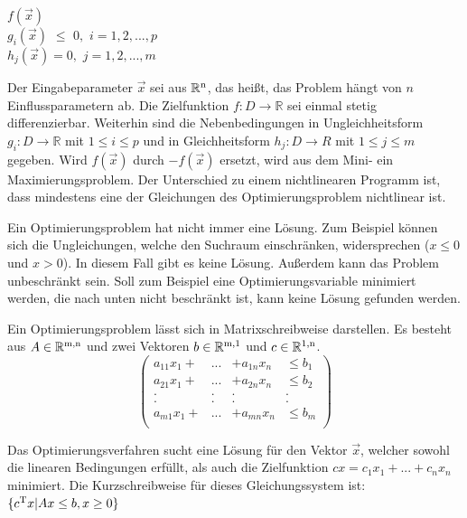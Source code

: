 \documentclass{like}
\begin{document}
\noindent\hspace*{3mm}%
$f(\vec{x}) $ \\
\noindent\hspace*{3mm}%
$g_i(\vec{x})$ $\leq$ $0,$ $i=1,2,...,p$  \\
\noindent\hspace*{50mm}%
$h_j(\vec{x})= 0,$ $j= 1,2,...,m$\\ 
\noindent\hspace*{50mm}%


Der Eingabeparameter $\vec{x}$ sei aus $\mathbb{R} \textsuperscript{n} $, das heißt, das Problem hängt von \(n\) Einflussparametern ab. Die Zielfunktion $f:D \rightarrow \mathbb{R} $ sei einmal stetig differenzierbar. Weiterhin sind die Nebenbedingungen in Ungleichheitsform $g_i:D \rightarrow \mathbb{R}$ mit $1\leq i \leq p$ und in Gleichheitsform $h_j:D \rightarrow \!R$ mit $1\leq j \leq m$ gegeben.
Wird \(f(\vec{x})\) durch \(-f(\vec{x})\) ersetzt, wird aus dem Mini- ein Maximierungsproblem. Der Unterschied zu einem nichtlinearen Programm ist, dass mindestens eine der Gleichungen des Optimierungsproblem nichtlinear ist.

Ein Optimierungsproblem hat nicht immer eine Lösung. Zum Beispiel können sich die  Ungleichungen, welche den Suchraum einschränken, widersprechen ($x \leq 0 $ und $x > 0$). In diesem Fall gibt es keine Lösung. Außerdem kann das Problem unbeschränkt sein. Soll zum Beispiel eine Optimierungsvariable minimiert werden, die nach unten nicht beschränkt ist, kann keine Lösung gefunden werden. 

Ein Optimierungsproblem lässt sich in Matrixschreibweise darstellen. Es besteht aus $A \in \mathbb{R} \textsuperscript{m,n}$ und zwei Vektoren $b \in \mathbb{R} \textsuperscript{m,1}$ und $c \in \mathbb{R} \textsuperscript{1,n}$. \\

\[ \left( \begin{array}{cccc}
a_{11} x_1 + & ... & + a_{1n} x_n & \leq b_1 \\   	
a_{21} x_1 + & ... & + a_{2n} x_n & \leq b_2 \\ 
. & . & . & . \\
. & . & . & . \\
a_{m1} x_1 + & ... & + a_{mn} x_n & \leq b_m \\
\end{array} \right)\] 

Das Optimierungsverfahren sucht eine Lösung für den Vektor \(\vec{x}\), welcher sowohl die linearen Bedingungen erfüllt, als auch die Zielfunktion 
$cx=c_1 x_1 + ... + c_n x_n$ minimiert.
Die Kurzschreibweise für dieses Gleichungssystem ist: \\
 $\{ c\textsuperscript{T}x | Ax \leq b, x \geq 0 \}$
\end{document}

